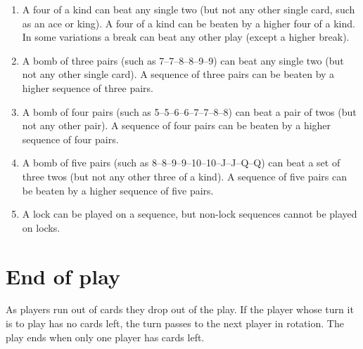 \documentclass[12pt]{article}
\begin{document}
\begin{enumerate}
    \item A four of a kind can beat any single two (but not any other single card, such as an ace or king). A four of a kind can be beaten by a higher four of a kind. In some variations a break can beat any other play (except a higher break).
    
    \item A bomb of three pairs (such as 7--7--8--8--9--9) can beat any single two (but not any other single card). A sequence of three pairs can be beaten by a higher sequence of three pairs.
    
    \item A bomb of four pairs (such as 5--5--6--6--7--7--8--8) can beat a pair of twos (but not any other pair). A sequence of four pairs can be beaten by a higher sequence of four pairs.
    
    \item A bomb of five pairs (such as 8--8--9--9--10--10--J--J--Q--Q) can beat a set of three twos (but not any other three of a kind). A sequence of five pairs can be beaten by a higher sequence of five pairs. 
    
    \item A lock can be played on a sequence, but non-lock sequences cannot be played on locks.
\end{enumerate}


\section{End of play}

As players run out of cards they drop out of the play. If the player whose turn it is to play has no cards left, the turn passes to the next player in rotation. The play ends when only one player has cards left. 
\end{document}
